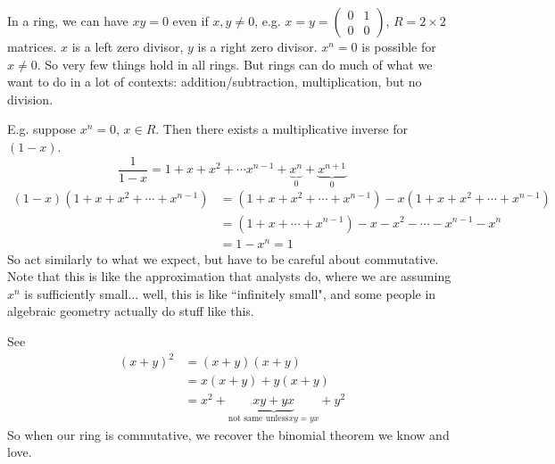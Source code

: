 \documentclass{article}
\theoremstyle{plain}
\theoremstyle{remark}
\begin{document}
In a ring, we can have $xy = 0$ even if $x,y \neq 0$,
e.g. $x = y = \begin{pmatrix} 0 & 1 \\ 0 & 0 \end{pmatrix}$, $R = 2\times 2$ matrices.
$x$ is a left zero divisor, $y$ is a right zero divisor.
$x^n = 0$ is possible for $x \neq 0$.
So very few things hold in all rings.
But rings can do much of what we want to do in a lot of contexts:
addition/subtraction, multiplication, but no division.

E.g. suppose $x^n = 0$, $x \in R$.
Then there exists a multiplicative inverse for $(1 - x)$.
\[
	\frac{1}{1-x} = 1 + x + x^2 + \cdots x^{n-1} +
	\underbrace{x^n}_{0} + \underbrace{x^{n+1}}_{0}
\]
\begin{align*}
	(1-x)(1 + x + x^2 + \cdots + x^{n-1})
	&= (1 + x + x^2 + \cdots + x^{n-1}) - x(1 + x + x^2 + \cdots + x^{n-1})\\
	&= (1+ x + \cdots + x^{n-1}) - x - x^2 - \cdots - x^{n-1} - x^n\\
	&= 1-x^n = 1
\end{align*}
So act similarly to what we expect, but have to be careful about commutative.
Note that this is like the approximation that analysts do,
where we are assuming $x^n$ is sufficiently small...
well, this is like ``infinitely small",
and some people in algebraic geometry actually do stuff like this.

See
\begin{align*}
	(x+y)^2
	&= (x+y)(x+y)\\
	&= x(x+y) + y(x+y)\\
	&= x^2 + \underbrace{xy + yx}_{\text{not same unless} xy = yx} + y^2
\end{align*}
So when our ring is commutative, we recover the binomial theorem we know and love.
\end{document}
